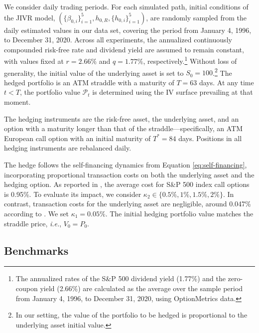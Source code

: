 \documentclass[12pt]{article}
\begin{document}
We consider daily trading periods.
For each simulated path, initial conditions of the JIVR model, $\left(\{ \beta_{0,i} \}^5_{i=1}, h_{0,R}, \{ h_{0,i}\}^5_{i=1}  \right)$, are randomly sampled from the daily estimated values in our data set, covering the period from January 4, 1996, to December 31, 2020. Across all experiments, the annualized continuously compounded risk-free rate and dividend yield are assumed to remain constant, with values fixed at $r = 2.66\%$ and $q = 1.77\%$, respectively.\footnote{The annualized rates of the S\&P 500 dividend yield (1.77\%) and the zero-coupon yield (2.66\%) are calculated as the average over the sample period from January 4, 1996, to December 31, 2020, using OptionMetrics data.}
Without loss of generality, the initial value of the underlying asset is set to $S_0=100$.\footnote{
    In our setting, the value of the portfolio to be hedged is proportional to the underlying asset initial value.} 
The hedged portfolio is an ATM straddle with a maturity of $T=63$ days. At any time $t<T$, the portfolio value \( \mathcal{P}_{t} \) is determined using the IV surface prevailing at that moment. %

The hedging instruments are the risk-free asset, the underlying asset, and an option with a maturity longer than that of the straddle—specifically, an ATM European call option with an initial maturity of $T^{*} = 84$ days. 
Positions in all hedging instruments are rebalanced daily.

The hedge follows the self-financing dynamics from Equation \eqref{eq:self-financing}, incorporating proportional transaction costs on both the underlying asset and the hedging option. As reported in \cite{chaudhury2019option}, the average cost for S\&P 500 index call options is 0.95\%. To evaluate its impact, we consider $\kappa_{2} \in \{0.5\%, 1\%, 1.5\%, 2\%\}$. In contrast, transaction costs for the underlying asset are negligible, around 0.047\% according to \cite{BAZZANA2020101240}. We set $\kappa_{1} = 0.05\%$. The initial hedging portfolio value matches the straddle price, \textit{i.e.}, $V_{0}=P_{0}$.

\subsection{Benchmarks}
\end{document}
